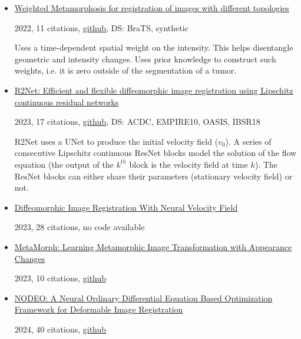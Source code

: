 \documentclass{article}
\begin{document}
\begin{itemize}
\item \href{https://cnrs.hal.science/hal-03971473/file/WBIR_2022_WeightedMetamorphosis.pdf}{Weighted Metamorphosis for registration of
images with different topologies}

2022, 11 citations, \href{https://github.com/antonfrancois/Demeter_metamorphosis}{github}, DS: BraTS, synthetic

Uses a time-dependent spatial weight on the intensity. This helps disentangle geometric and intensity changes. Uses prior knowledge to construct such weights, i.e. it is zero outside of the segmentation of a tumor.

\item \href{https://www.sciencedirect.com/science/article/pii/S1361841523001779}{R2Net: Efficient and flexible diffeomorphic image registration using Lipschitz continuous residual networks}

2023, 17 citations, \href{https://github.com/ankitajoshi15/R2Net}{github}, DS: ACDC, EMPIRE10, OASIS, IBSR18

R2Net uses a UNet to produce the initial velocity field ($v_0$). A series of consecutive Lipschitz continuous ResNet blocks model the solution of the flow equation (the output of the $k^{th}$ block is the velocity field at time $k$). The ResNet blocks can either share their parameters (stationary velocity field) or not.

\item \href{https://openaccess.thecvf.com/content/WACV2023/html/Han_Diffeomorphic_Image_Registration_With_Neural_Velocity_Field_WACV_2023_paper.html}{Diffeomorphic Image Registration With Neural Velocity Field}

2023, 28 citations, no code available

\item \href{https://arxiv.org/abs/2303.04849}{MetaMorph: Learning Metamorphic Image Transformation with Appearance Changes}

2023, 10 citations, \href{https://github.com/jw4hv/metamorph/blob/Initial/README.md}{github}

\item \href{https://openaccess.thecvf.com/content/CVPR2022/papers/Wu_NODEO_A_Neural_Ordinary_Differential_Equation_Based_Optimization_Framework_for_CVPR_2022_paper.pdf}{NODEO: A Neural Ordinary Differential Equation Based Optimization
Framework for Deformable Image Registration}

2024, 40 citations, \href{https://github.com/yifannnwu/NODEO-DIR}{github}


\end{itemize}
\end{document}
